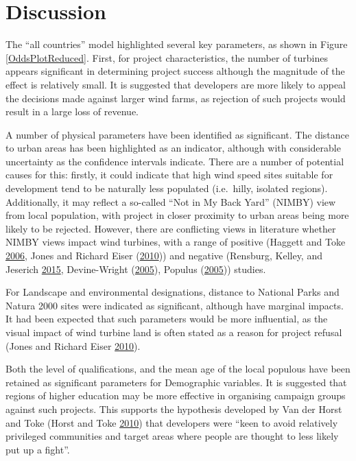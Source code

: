 \documentclass[a4paper,]{article}
\theoremstyle{definition}
\theoremstyle{definition}
\theoremstyle{remark}
\begin{document}
{\section{Discussion}\label{discussion}

The ``all countries'' model highlighted several key parameters, as shown
in Figure \ref{OddsPlotReduced}. First, for project characteristics, the
number of turbines appears significant in determining project success
although the magnitude of the effect is relatively small. It is
suggested that developers are more likely to appeal the decisions made
against larger wind farms, as rejection of such projects would result in
a large loss of revenue.

A number of physical parameters have been identified as significant. The
distance to urban areas has been highlighted as an indicator, although
with considerable uncertainty as the confidence intervals indicate.
There are a number of potential causes for this: firstly, it could
indicate that high wind speed sites suitable for development tend to be
naturally less populated (i.e.~hilly, isolated regions). Additionally,
it may reflect a so-called ``Not in My Back Yard'' (NIMBY) view from
local population, with project in closer proximity to urban areas being
more likely to be rejected. However, there are conflicting views in
literature whether NIMBY views impact wind turbines, with a range of
positive (Haggett and Toke \protect\hyperlink{ref-Haggett2006}{2006},
Jones and Richard Eiser (\protect\hyperlink{ref-Jones2010a}{2010})) and
negative (Rensburg, Kelley, and Jeserich
\protect\hyperlink{ref-VanRensburg20}{2015}, Devine-Wright
(\protect\hyperlink{ref-Devine-Wright2005a}{2005}), Populus
(\protect\hyperlink{ref-Populus2005}{2005})) studies.

For Landscape and environmental designations, distance to National Parks
and Natura 2000 sites were indicated as significant, although have
marginal impacts. It had been expected that such parameters would be
more influential, as the visual impact of wind turbine land is often
stated as a reason for project refusal (Jones and Richard Eiser
\protect\hyperlink{ref-Jones2010a}{2010}).

Both the level of qualifications, and the mean age of the local populous
have been retained as significant parameters for Demographic variables.
It is suggested that regions of higher education may be more effective
in organising campaign groups against such projects. This supports the
hypothesis developed by Van der Horst and Toke (Horst and Toke
\protect\hyperlink{ref-VanderHorst2010}{2010}) that developers were
``keen to avoid relatively privileged communities and target areas where
people are thought to less likely put up a fight''.

}
\end{document}

